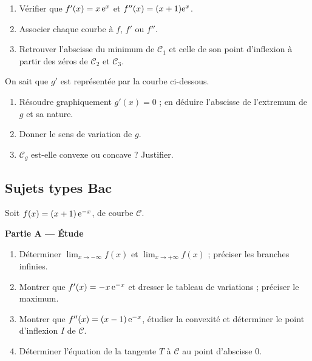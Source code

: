\begin{enumerate}
	\item Vérifier que $f'(x)=x\,\mathrm{e}^{x}$ et $f''(x)=(x+1)\mathrm{e}^{x}$.
	\item Associer chaque courbe à $f$, $f'$ ou $f''$.
	\item Retrouver l'abscisse du minimum de $\mathcal C_1$ et celle de son
	point d'inflexion à partir des zéros de $\mathcal C_2$ et $\mathcal C_3$.
\end{enumerate}

On sait que $g'$ est représentée par la courbe ci-dessous.
\begin{center}
\end{center}
\begin{enumerate}
	\item Résoudre graphiquement $g'(x)=0$ ; en déduire l'abscisse de
	l'extremum de $g$ et sa nature.
	\item Donner le sens de variation de $g$.
	\item $\mathcal C_g$ est-elle convexe ou concave ? Justifier.
\end{enumerate}

\subsection{Sujets types Bac}

Soit $f(x)=(x+1)\,\mathrm{e}^{-x}$, de courbe $\mathcal C$.

\textbf{Partie A — Étude}
\begin{enumerate}
	\item Déterminer $\displaystyle\lim_{x\to-\infty}f(x)$ et
	$\displaystyle\lim_{x\to+\infty}f(x)$ ; préciser les branches infinies.
	\item Montrer que $f'(x)=-x\,\mathrm{e}^{-x}$ et dresser le tableau de
	variations ; préciser le maximum.
	\item Montrer que $f''(x)=(x-1)\,\mathrm{e}^{-x}$, étudier la convexité et
	déterminer le point d'inflexion $I$ de $\mathcal C$.
	\item Déterminer l'équation de la tangente $T$ à $\mathcal C$ au point
	d'abscisse $0$.
\end{enumerate}

